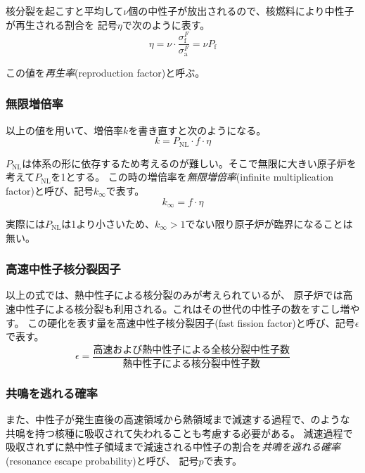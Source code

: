 核分裂を起こすと平均して$\nu$個の中性子が放出されるので、核燃料により中性子が再生される割合を
記号$\eta$で次のように表す。
\begin{equation}
  \eta = \nu \cdot \frac{\sigma_\text{f}^{F}}{\sigma_\text{a}^{F}} = \nu P_\text{f}
\end{equation}

この値を\emph{再生率}(reproduction factor)と呼ぶ。

\subsubsection{無限増倍率}
以上の値を用いて、増倍率$k$を書き直すと次のようになる。
\begin{equation}
  k = P_\text{NL} \cdot f \cdot \eta
\end{equation}

$P_\text{NL}$は体系の形に依存するため考えるのが難しい。そこで無限に大きい原子炉を考えて$P_\text{NL}$を1とする。
この時の増倍率を\emph{無限増倍率}(infinite multiplication factor)と呼び、記号$k_\infty$で表す。
\begin{equation}
  k_\infty = f \cdot \eta
\end{equation}

実際には$P_\text{NL}$は1より小さいため、$k_\infty > 1$でない限り原子炉が臨界になることは無い。

\subsubsection{高速中性子核分裂因子}
以上の式では、熱中性子による核分裂のみが考えられているが、
原子炉では高速中性子による核分裂も利用される。これはその世代の中性子の数をすこし増やす。
この硬化を表す量を高速中性子核分裂因子(fast fission factor)と呼び、記号$\epsilon$で表す。
\begin{equation}
  \epsilon = \frac{\text{高速および熱中性子による全核分裂中性子数}}{\text{熱中性子による核分裂中性子数}}
\end{equation}

\subsubsection{共鳴を逃れる確率}
また、中性子が発生直後の高速領域から熱領域まで減速する過程で、のような
共鳴を持つ核種に吸収されて失われることも考慮する必要がある。
減速過程で吸収されずに熱中性子領域まで減速される中性子の割合を\emph{共鳴を逃れる確率}(resonance escape probability)と呼び、
記号$p$で表す。


